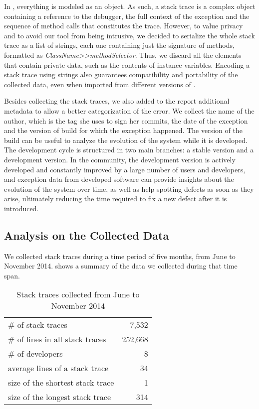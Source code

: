 In \pha, everything is modeled as an object.
As such, a stack trace is a complex object containing a reference to the debugger, the full context of the exception and the sequence of method calls that constitutes the trace.
However, to value privacy and to avoid our tool from being intrusive, we decided to serialize the whole stack trace as a list of strings, each one containing just the signature of methods, formatted as \textit{ClassName{>}{>}methodSelector}.
Thus, we discard all the elements that contain private data, such as the contents of instance variables.
Encoding a stack trace using strings also guarantees compatibility and portability of the collected data, even when imported from different versions of \pha.

Besides collecting the stack traces, we also added to the report additional metadata to allow a better categorization of the error.
We collect the name of the author, which is the tag she uses to sign her commits, the date of the exception and the version of \pha build for which the exception happened.
The version of the build can be useful to analyze the evolution of the system while it is developed.
The \pha development cycle is structured in two main branches: a stable version and a development version.
In the \pha community, the development version is actively developed and constantly improved by a large number of users and developers, and exception data from developed software can provide insights about the evolution of the system over time, as well as help spotting defects as soon as they arise, ultimately reducing the time required to fix a new defect after it is introduced.

\subsection{Analysis on the Collected Data}

We collected stack traces during a time period of five months, from June to November 2014.
 shows a summary of the data we collected during that time span.

\begin{table}[h]
\caption{Stack traces collected from June to November 2014}
\begin{center}
\begin{tabular}{lr}
\# of stack traces & 7,532 \\
\# of lines in all stack traces & 252,668 \\
\# of developers & 8 \\
average lines of a stack trace & 34 \\
size of the shortest stack trace & 1 \\
size of the longest stack trace & 314 \\
\end{tabular}
\end{center}
\label{tab:data-summary}
\end{table}

